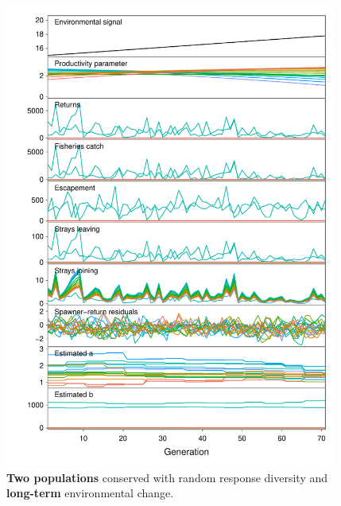 \begin{figure}[htbp]
\centering
\includegraphics[width=4.3in]{metafolio/n-linear-sim-2}
\caption{\textbf{Two populations} conserved with random response diversity and
\textbf{long-term} environmental change.}
\label{f:eg-n-linear-two}
\end{figure}

\clearpage

